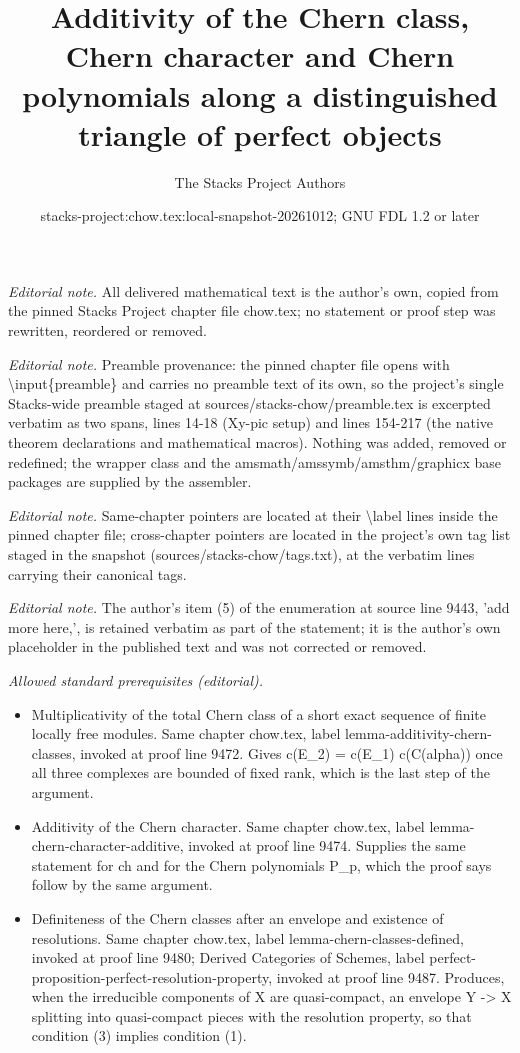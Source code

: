 \documentclass[10pt,a4paper]{amsart}
\title{Additivity of the Chern class, Chern character and Chern polynomials along a distinguished triangle of perfect objects}
\author{The Stacks Project Authors}
\date{stacks-project:chow.tex:local-snapshot-20261012; GNU FDL 1.2 or later}
\theoremstyle{plain}
\theoremstyle{definition}
\theoremstyle{remark}
\numberwithin{equation}{subsection}
\begin{document}
\maketitle
\noindent\textit{Editorial note.} All delivered mathematical text is the author's own, copied from the pinned Stacks Project chapter file chow.tex; no statement or proof step was rewritten, reordered or removed.\par\medskip
\noindent\textit{Editorial note.} Preamble provenance: the pinned chapter file opens with \textbackslash{}input\{preamble\} and carries no preamble text of its own, so the project's single Stacks-wide preamble staged at sources/stacks-chow/preamble.tex is excerpted verbatim as two spans, lines 14-18 (Xy-pic setup) and lines 154-217 (the native theorem declarations and mathematical macros). Nothing was added, removed or redefined; the wrapper class and the amsmath/amssymb/amsthm/graphicx base packages are supplied by the assembler.\par\medskip
\noindent\textit{Editorial note.} Same-chapter pointers are located at their \textbackslash{}label lines inside the pinned chapter file; cross-chapter pointers are located in the project's own tag list staged in the snapshot (sources/stacks-chow/tags.txt), at the verbatim lines carrying their canonical tags.\par\medskip
\noindent\textit{Editorial note.} The author's item (5) of the enumeration at source line 9443, 'add more here,', is retained verbatim as part of the statement; it is the author's own placeholder in the published text and was not corrected or removed.\par\medskip
\noindent\textit{Allowed standard prerequisites (editorial).}\begin{itemize}
\item Multiplicativity of the total Chern class of a short exact sequence of finite locally free modules. Same chapter chow.tex, label lemma-additivity-chern-classes, invoked at proof line 9472. Gives c(E\_2) = c(E\_1) c(C(alpha)) once all three complexes are bounded of fixed rank, which is the last step of the argument.
\item Additivity of the Chern character. Same chapter chow.tex, label lemma-chern-character-additive, invoked at proof line 9474. Supplies the same statement for ch and for the Chern polynomials P\_p, which the proof says follow by the same argument.
\item Definiteness of the Chern classes after an envelope and existence of resolutions. Same chapter chow.tex, label lemma-chern-classes-defined, invoked at proof line 9480; Derived Categories of Schemes, label perfect-proposition-perfect-resolution-property, invoked at proof line 9487. Produces, when the irreducible components of X are quasi-compact, an envelope Y -> X splitting into quasi-compact pieces with the resolution property, so that condition (3) implies condition (1).
\end{itemize}\medskip
\end{document}
